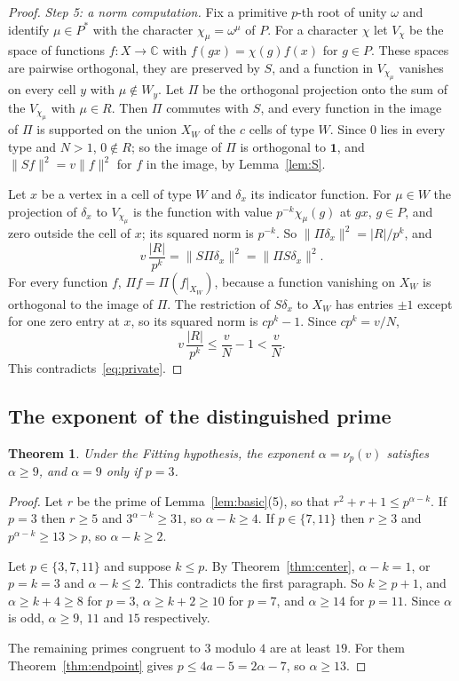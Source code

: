 \documentclass[11pt]{amsart}
\newtheorem{theorem}{Theorem}
\theoremstyle{definition}
\theoremstyle{remark}
\newcommand{\C}{\mathbb{C}}
\newcommand{\one}{\mathbf{1}}
\begin{document}
\begin{proof}
\emph{Step 5: a norm computation.} Fix a primitive $p$-th root of unity $\omega$ and identify $\mu\in P^*$ with the character $\chi_\mu=\omega^\mu$ of $P$. For a character $\chi$ let $V_\chi$ be the space of functions $f\colon X\to\C$ with $f(gx)=\chi(g)f(x)$ for $g\in P$. These spaces are pairwise orthogonal, they are preserved by $S$, and a function in $V_{\chi_\mu}$ vanishes on every cell $y$ with $\mu\notin W_y$. Let $\Pi$ be the orthogonal projection onto the sum of the $V_{\chi_\mu}$ with $\mu\in R$. Then $\Pi$ commutes with $S$, and every function in the image of $\Pi$ is supported on the union $X_W$ of the $c$ cells of type $W$. Since $0$ lies in every type and $N>1$, $0\notin R$; so the image of $\Pi$ is orthogonal to $\one$, and $\|Sf\|^2=v\|f\|^2$ for $f$ in the image, by Lemma~\ref{lem:S}.

Let $x$ be a vertex in a cell of type $W$ and $\delta_x$ its indicator function. For $\mu\in W$ the projection of $\delta_x$ to $V_{\chi_\mu}$ is the function with value $p^{-k}\chi_\mu(g)$ at $gx$, $g\in P$, and zero outside the cell of $x$; its squared norm is $p^{-k}$. So $\|\Pi\delta_x\|^2=|R|/p^k$, and
\[
v\,\frac{|R|}{p^k}=\|S\Pi\delta_x\|^2=\|\Pi S\delta_x\|^2 .
\]
For every function $f$, $\Pi f=\Pi(f|_{X_W})$, because a function vanishing on $X_W$ is orthogonal to the image of $\Pi$. The restriction of $S\delta_x$ to $X_W$ has entries $\pm1$ except for one zero entry at $x$, so its squared norm is $cp^k-1$. Since $cp^k=v/N$,
\[
v\,\frac{|R|}{p^k}\le\frac vN-1<\frac vN .
\]
This contradicts~\eqref{eq:private}.
\end{proof}

\subsection{The exponent of the distinguished prime}

\begin{theorem}\label{thm:powers}
Under the Fitting hypothesis, the exponent $\alpha=\nu_p(v)$ satisfies $\alpha\ge9$, and $\alpha=9$ only if $p=3$.
\end{theorem}
\begin{proof}
Let $r$ be the prime of Lemma~\ref{lem:basic}(5), so that $r^2+r+1\le p^{\alpha-k}$. If $p=3$ then $r\ge5$ and $3^{\alpha-k}\ge31$, so $\alpha-k\ge4$. If $p\in\{7,11\}$ then $r\ge3$ and $p^{\alpha-k}\ge13>p$, so $\alpha-k\ge2$.

Let $p\in\{3,7,11\}$ and suppose $k\le p$. By Theorem~\ref{thm:center}, $\alpha-k=1$, or $p=k=3$ and $\alpha-k\le2$. This contradicts the first paragraph. So $k\ge p+1$, and $\alpha\ge k+4\ge8$ for $p=3$, $\alpha\ge k+2\ge10$ for $p=7$, and $\alpha\ge14$ for $p=11$. Since $\alpha$ is odd, $\alpha\ge9$, $11$ and $15$ respectively.

The remaining primes congruent to $3$ modulo $4$ are at least $19$. For them Theorem~\ref{thm:endpoint} gives $p\le4a-5=2\alpha-7$, so $\alpha\ge13$.
\end{proof}
\end{document}

